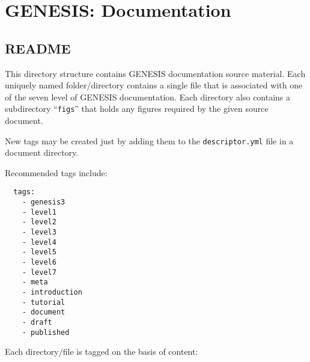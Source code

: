\documentclass[12pt]{article}
\begin{document}
\section*{GENESIS: Documentation}

\subsection*{README}


This directory structure contains GENESIS documentation source material. Each uniquely named folder/directory contains a single file that is associated with one of the seven level of GENESIS documentation. Each directory also contains a subdirectory ``{\tt figs}'' that holds any figures required by the given source document.

New tags may be created just by adding them to the {\tt descriptor.yml} file in a document directory. 

Recommended tags include:
\begin{verbatim}
  tags:
    - genesis3
    - level1
    - level2
    - level3
    - level4
    - level5
    - level6
    - level7
    - meta
    - introduction
    - tutorial
    - document
    - draft
    - published
\end{verbatim}
Each directory/file is tagged on the basis of content:
\end{document}
